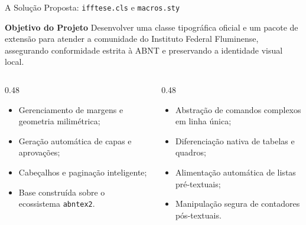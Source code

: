\documentclass[aspectratio=169, 10pt]{beamer}
\begin{document}
\begin{frame}{A Solução Proposta: \texttt{ifftese.cls} e \texttt{macros.sty}}
  \begin{block}{\textbf{Objetivo do Projeto}}
    \tiny Desenvolver uma classe tipográfica oficial e um pacote de extensão para atender a comunidade do Instituto Federal Fluminense, assegurando conformidade estrita à ABNT e preservando a identidade visual local.
  \end{block}
  \vspace{0.06cm}
  \begin{columns}[T]
    \begin{column}{0.48\textwidth}
      \begin{tcolorbox}[colback=white,colframe=iffprimary,arc=1.5mm,title=\textbf{Classe \texttt{ifftese.cls}}]
        \scriptsize
        \begin{itemize}\setlength{\itemsep}{1.5pt}
          \item Gerenciamento de margens e geometria milimétrica;
          \item Geração automática de capas e aprovações;
          \item Cabeçalhos e paginação inteligente;
          \item Base construída sobre o ecossistema \texttt{abntex2}.
        \end{itemize}
      \end{tcolorbox}
    \end{column}

    \begin{column}{0.48\textwidth}
      \begin{tcolorbox}[colback=white,colframe=conepeteal,arc=1.5mm,title=\textbf{Extensão \texttt{macros.sty}}]
        \scriptsize
        \begin{itemize}\setlength{\itemsep}{1.5pt}
          \item Abstração de comandos complexos em linha única;
          \item Diferenciação nativa de tabelas e quadros;
          \item Alimentação automática de listas pré-textuais;
          \item Manipulação segura de contadores pós-textuais.
        \end{itemize}
      \end{tcolorbox}
    \end{column}
  \end{columns}
\end{frame}
\end{document}
